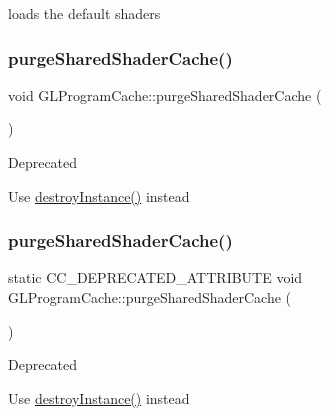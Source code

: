loads the default shaders \mbox{\label{classGLProgramCache_a3cb3a02ba5cf4a83a1186974dc1e2955}} 
\subsubsection{\texorpdfstring{purge\+Shared\+Shader\+Cache()}{purgeSharedShaderCache()}\hspace{0.1cm}{\footnotesize\ttfamily [1/2]}}
{\footnotesize\ttfamily void G\+L\+Program\+Cache\+::purge\+Shared\+Shader\+Cache (\begin{DoxyParamCaption}{ }\end{DoxyParamCaption})\hspace{0.3cm}{\ttfamily [static]}}

\begin{DoxyRefDesc}{Deprecated}
\item[\hyperlink{deprecated__deprecated000134}{Deprecated}]Use \hyperlink{classGLProgramCache_a4a222023d3d21b6f4ed74077a4524e59}{destroy\+Instance()} instead \end{DoxyRefDesc}
\mbox{\label{classGLProgramCache_a5b1a5c9989fefbc71f6c2d558bf05cef}} 
\subsubsection{\texorpdfstring{purge\+Shared\+Shader\+Cache()}{purgeSharedShaderCache()}\hspace{0.1cm}{\footnotesize\ttfamily [2/2]}}
{\footnotesize\ttfamily static C\+C\+\_\+\+D\+E\+P\+R\+E\+C\+A\+T\+E\+D\+\_\+\+A\+T\+T\+R\+I\+B\+U\+TE void G\+L\+Program\+Cache\+::purge\+Shared\+Shader\+Cache (\begin{DoxyParamCaption}{ }\end{DoxyParamCaption})\hspace{0.3cm}{\ttfamily [static]}}

\begin{DoxyRefDesc}{Deprecated}
\item[\hyperlink{deprecated__deprecated000364}{Deprecated}]Use \hyperlink{classGLProgramCache_a4a222023d3d21b6f4ed74077a4524e59}{destroy\+Instance()} instead \end{DoxyRefDesc}
\mbox{\label{classGLProgramCache_a8405ebabc9102acb46c6f17beae701f6}} 

